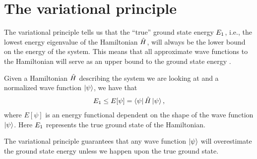     \section{The variational principle}
        The variational principle tells us that the ``true'' ground state energy
        $E_1$, i.e., the lowest energy eigenvalue of the Hamiltonian
        $\hat{H}$, will always be the lower bound on the energy of the system.
        This means that all approximate wave functions to the Hamiltonian will
        serve as an upper bound to the ground state energy
        \cite{griffiths2017introduction}.
        \begin{theorem}
            Given a Hamiltonian $\hat{H}$ describing the system we are looking
            at and a normalized wave function $\ket{\psi}$, we have that
            \begin{align}
                E_1
                \leq
                E[\psi]
                = \bra{\psi}\hat{H}\ket{\psi},
                \label{eq:variational-principle}
            \end{align}
            where $E[\psi]$ is an energy functional dependent on the shape of
            the wave function $\ket{\psi}$.
            Here $E_1$ represents the true ground state of the
            Hamiltonian.
        \end{theorem}
        The variational principle guarantees that any wave function $\ket{\psi}$
        will overestimate the ground state energy unless we happen upon the true
        ground state.
